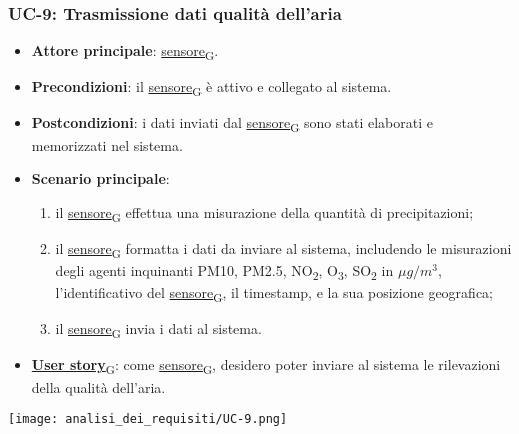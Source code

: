 \newpage
\subsubsection{UC-9: Trasmissione dati qualità dell'aria}
\begin{itemize}
	\item \textbf{Attore principale}: \href{https://7last.github.io/docs/pb/documentazione-interna/glossario\#sensore}{sensore\textsubscript{G}}.
	\item \textbf{Precondizioni}: il \href{https://7last.github.io/docs/pb/documentazione-interna/glossario\#sensore}{sensore\textsubscript{G}} è attivo e collegato al sistema.
	\item \textbf{Postcondizioni}: i dati inviati dal \href{https://7last.github.io/docs/pb/documentazione-interna/glossario\#sensore}{sensore\textsubscript{G}} sono stati elaborati e memorizzati nel sistema.
	\item \textbf{Scenario principale}:
	      \begin{enumerate}
		      \item il \href{https://7last.github.io/docs/pb/documentazione-interna/glossario\#sensore}{sensore\textsubscript{G}} effettua una misurazione della quantità di precipitazioni;
		      \item il \href{https://7last.github.io/docs/pb/documentazione-interna/glossario\#sensore}{sensore\textsubscript{G}} formatta i dati da inviare al sistema, includendo le misurazioni degli agenti inquinanti PM10, PM2.5, NO\textsubscript{2}, O\textsubscript{3}, SO\textsubscript{2}
		            in $\mu g/m^3$, l'identificativo del \href{https://7last.github.io/docs/pb/documentazione-interna/glossario\#sensore}{sensore\textsubscript{G}}, il timestamp, e la sua posizione geografica;
		      \item il \href{https://7last.github.io/docs/pb/documentazione-interna/glossario\#sensore}{sensore\textsubscript{G}} invia i dati al sistema.
	      \end{enumerate}
	\item \href{https://7last.github.io/docs/pb/documentazione-interna/glossario\#user-story}{\textbf{User story}\textsubscript{G}}:
	      come \href{https://7last.github.io/docs/pb/documentazione-interna/glossario\#sensore}{sensore\textsubscript{G}}, desidero poter inviare al sistema le rilevazioni della qualità dell'aria.
\end{itemize}
\begin{center}
	\texttt{[image: analisi\_dei\_requisiti/UC-9.png]}
\end{center}

